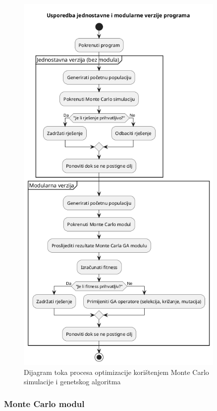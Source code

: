 \begin{figure}[H]
    \centering
    \includegraphics[width=0.9\textwidth]{slike/diagram_mc_ga.png}
    \caption{Dijagram toka procesa optimizacije korištenjem Monte Carlo simulacije i genetskog algoritma}
    \label{fig:diagram_ga_mc}
\end{figure}

\subsubsection{Monte Carlo modul}

